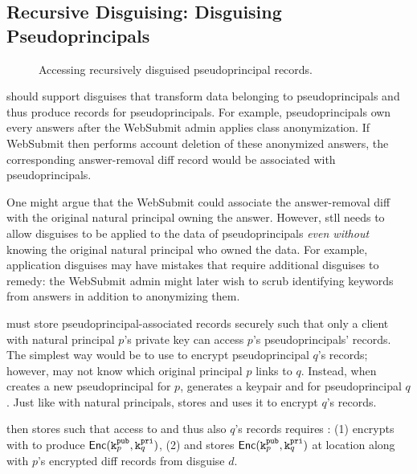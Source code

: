 \subsection{Recursive Disguising: Disguising Pseudoprincipals}
\begin{figure}[t!]
    \centering
    \caption{Accessing recursively disguised pseudoprincipal records.}
    \label{f:recursive}
\end{figure}

\sys should support disguises that transform data belonging to pseudoprincipals and thus produce
records for pseudoprincipals. For example, pseudoprincipals own every answers after the WebSubmit
admin applies class anonymization. If WebSubmit then performs account deletion of these anonymized
answers, the corresponding answer-removal diff record would be associated with pseudoprincipals.

One might argue that the WebSubmit could associate the answer-removal diff with the original natural
principal owning the answer. However, \sys stll needs to allow disguises to be applied to the data
of pseudoprincipals \emph{even without} knowing the original natural principal who owned the data.
For example, application disguises may have mistakes that require additional disguises to remedy:
the WebSubmit admin might later wish to scrub identifying keywords from answers in addition to
anonymizing them.

\sys must store pseudoprincipal-associated records securely such that only a client with natural
principal $p$'s private key can access $p$'s pseudoprincipals' records. The simplest way would be
to use  to encrypt pseudoprincipal $q$'s records; however, \sys may not know which original principal
$p$ links to $q$.
%
Instead, when \sys creates a new pseudoprincipal for $p$, \sys generates a keypair
 and  for pseudoprincipal $q$.
Just like with natural principals, \sys stores  and uses it to encrypt $q$'s records.

\sys then stores  such that access to  and thus also $q$'s records requires
: \sys 
%
(1) encrypts  with  to produce $\mathsf{Enc}(\texttt{\ensuremath{\texttt{k}^{\text{pub}}_{p}}}, \texttt{\ensuremath{\texttt{k}^{\text{pri}}_{q}}})$,
%
(2) and stores $\mathsf{Enc}(\texttt{\ensuremath{\texttt{k}^{\text{pub}}_{p}}}, \texttt{\ensuremath{\texttt{k}^{\text{pri}}_{q}}})$ at location  along with $p$'s encrypted diff
records from disguise $d$.

